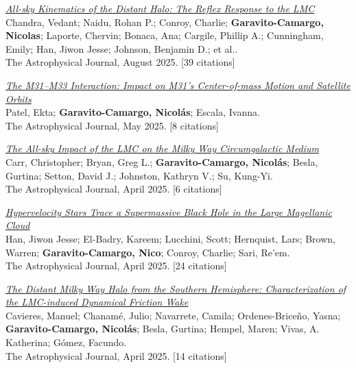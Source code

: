 \documentclass[14pt]{article}
\begin{document}
\begin{etaremune}
\item \textit{\href{https://ui.adsabs.harvard.edu/abs/2025ApJ...988..156C/abstract}{All-sky Kinematics of the Distant Halo: The Reflex Response to the LMC}}\\
  {\small \color{darkgray} Chandra, Vedant; Naidu, Rohan P.; Conroy, Charlie; \textbf{Garavito-Camargo, Nicolas}; Laporte, Chervin; Bonaca, Ana; Cargile, Phillip A.; Cunningham, Emily; Han, Jiwon Jesse; Johnson, Benjamin D.; et al..\\
  The Astrophysical Journal, August 2025. [39 citations]}

\item \textit{\href{https://ui.adsabs.harvard.edu/abs/2025ApJ...985..121P/abstract}{The M31--M33 Interaction: Impact on M31's Center-of-mass Motion and Satellite Orbits}}\\
  {\small \color{darkgray} Patel, Ekta; \textbf{Garavito-Camargo, Nicolás}; Escala, Ivanna.\\
  The Astrophysical Journal, May 2025. [8 citations]}

\item \textit{\href{https://ui.adsabs.harvard.edu/abs/2025ApJ...983..151C/abstract}{The All-sky Impact of the LMC on the Milky Way Circumgalactic Medium}}\\
  {\small \color{darkgray} Carr, Christopher; Bryan, Greg L.; \textbf{Garavito-Camargo, Nicolás}; Besla, Gurtina; Setton, David J.; Johnston, Kathryn V.; Su, Kung-Yi.\\
  The Astrophysical Journal, April 2025. [6 citations]}

\item \textit{\href{https://ui.adsabs.harvard.edu/abs/2025ApJ...982..188H/abstract}{Hypervelocity Stars Trace a Supermassive Black Hole in the Large Magellanic Cloud}}\\
  {\small \color{darkgray} Han, Jiwon Jesse; El-Badry, Kareem; Lucchini, Scott; Hernquist, Lars; Brown, Warren; \textbf{Garavito-Camargo, Nico}; Conroy, Charlie; Sari, Re'em.\\
  The Astrophysical Journal, April 2025. [24 citations]}

\item \textit{\href{https://ui.adsabs.harvard.edu/abs/2025ApJ...983...83C/abstract}{The Distant Milky Way Halo from the Southern Hemisphere: Characterization of the LMC-induced Dynamical Friction Wake}}\\
  {\small \color{darkgray} Cavieres, Manuel; Chanamé, Julio; Navarrete, Camila; Ordenes-Briceño, Yasna; \textbf{Garavito-Camargo, Nicolás}; Besla, Gurtina; Hempel, Maren; Vivas, A. Katherina; Gómez, Facundo.\\
  The Astrophysical Journal, April 2025. [14 citations]}


\end{etaremune}
\end{document}
